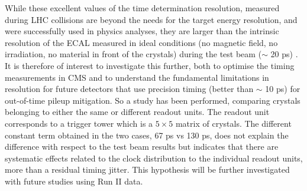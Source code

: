 \documentclass[journal]{IEEEtran}
\begin{document}
While these excellent values of the time determination resolution, measured during LHC collisions are beyond the needs for the target energy resolution, and were successfully used in physics analyses, they are larger than the intrinsic resolution of the ECAL measured in ideal conditions (no magnetic field, no irradiation, no material in front of the crystals) during the test beam ($\sim$ 20 ps) \cite{Chatrchyan:2009aj}. It is therefore of interest to investigate this further, both to optimise the timing measurements in CMS and to understand the fundamental limitations in resolution for future detectors that use precision timing (better than $\sim$ 10 ps) for out-of-time pileup mitigation. So a study has been performed, comparing crystals belonging to either the same or different readout units. The readout unit corresponds to a trigger tower which is a $5 \times 5$ matrix of crystals.  The different constant term obtained in the two cases, 67 ps vs 130 ps, does not explain the difference with respect to the test beam results but indicates that there are systematic effects related to the clock distribution to the individual readout units, more than a residual timing jitter. This hypothesis will be further investigated with future studies using Run II data.
%
\end{document}

